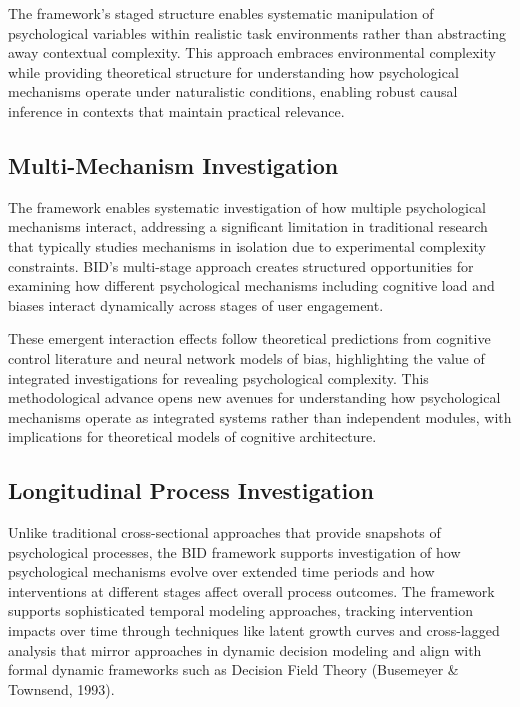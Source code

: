 \documentclass[
  authoryear,
  preprint]{elsarticle}
\begin{document}
The framework's staged structure enables systematic manipulation of
psychological variables within realistic task environments rather than
abstracting away contextual complexity. This approach embraces
environmental complexity while providing theoretical structure for
understanding how psychological mechanisms operate under naturalistic
conditions, enabling robust causal inference in contexts that maintain
practical relevance.

\subsection{Multi-Mechanism
Investigation}\label{multi-mechanism-investigation}

The framework enables systematic investigation of how multiple
psychological mechanisms interact, addressing a significant limitation
in traditional research that typically studies mechanisms in isolation
due to experimental complexity constraints. BID's multi-stage approach
creates structured opportunities for examining how different
psychological mechanisms including cognitive load and biases interact
dynamically across stages of user engagement.

These emergent interaction effects follow theoretical predictions from
cognitive control literature and neural network models of bias,
highlighting the value of integrated investigations for revealing
psychological complexity. This methodological advance opens new avenues
for understanding how psychological mechanisms operate as integrated
systems rather than independent modules, with implications for
theoretical models of cognitive architecture.

\subsection{Longitudinal Process
Investigation}\label{longitudinal-process-investigation}

Unlike traditional cross-sectional approaches that provide snapshots of
psychological processes, the BID framework supports investigation of how
psychological mechanisms evolve over extended time periods and how
interventions at different stages affect overall process outcomes. The
framework supports sophisticated temporal modeling approaches, tracking
intervention impacts over time through techniques like latent growth
curves and cross-lagged analysis that mirror approaches in dynamic
decision modeling and align with formal dynamic frameworks such as
Decision Field Theory (Busemeyer \& Townsend, 1993).
\end{document}
